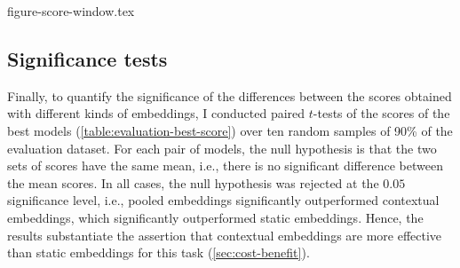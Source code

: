 {figure-score-window.tex}

\subsection{Significance tests}
\label{sec:significance}

Finally, to quantify the significance of the differences between the scores obtained
with different kinds of embeddings, I conducted paired $t$-tests of the scores of the
best models (\cref{table:evaluation-best-score}) over ten random samples of 90\% of the
evaluation dataset.
For each pair of models, the null hypothesis is that the two sets of scores have the
same mean, i.e., there is no significant difference between the mean scores.
In all cases, the null hypothesis was rejected at the $0.05$ significance level, i.e.,
pooled embeddings significantly outperformed contextual embeddings, which significantly
outperformed static embeddings.
Hence, the results substantiate the assertion that contextual embeddings are more
effective than static embeddings for this task (\cref{sec:cost-benefit}).
